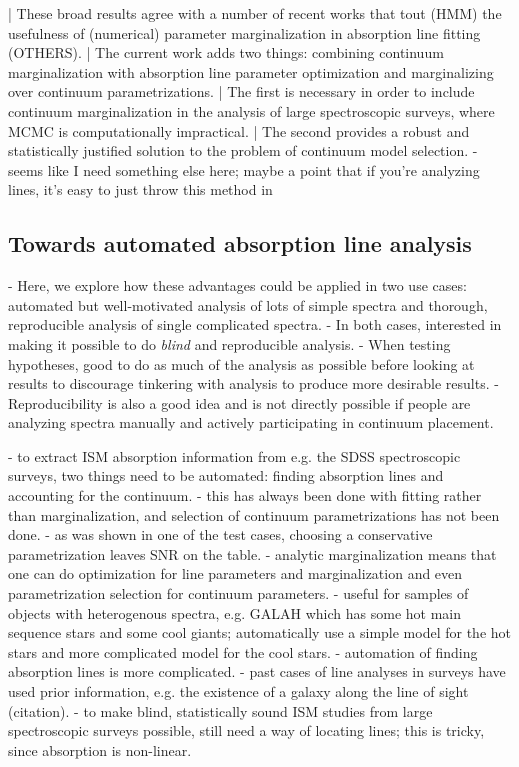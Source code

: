 \documentclass[manuscript]{aastex62}
\begin{document}
| These broad results agree with a number of recent works that tout (HMM) the usefulness of (numerical) parameter marginalization in absorption line fitting \citep{2017ApJ...844..136E} (OTHERS).
| The current work adds two things: combining continuum marginalization with absorption line parameter optimization and marginalizing over continuum parametrizations.
| The first is necessary in order to include continuum marginalization in the analysis of large spectroscopic surveys, where MCMC is computationally impractical.
| The second provides a robust and statistically justified solution to the problem of continuum model selection.
- seems like I need something else here; maybe a point that if you're analyzing lines, it's easy to just throw this method in


\subsection{Towards automated absorption line analysis}
- Here, we explore how these advantages could be applied in two use cases: automated but well-motivated analysis of lots of simple spectra and thorough, reproducible analysis of single complicated spectra.
- In both cases, interested in making it possible to do \emph{blind} and reproducible analysis.
- When testing hypotheses, good to do as much of the analysis as possible before looking at results to discourage tinkering with analysis to produce more desirable results.
- Reproducibility is also a good idea and is not directly possible if people are analyzing spectra manually and actively participating in continuum placement.

- to extract ISM absorption information from e.g. the SDSS spectroscopic surveys, two things need to be automated: finding absorption lines and accounting for the continuum.
- this has always been done with fitting rather than marginalization, and selection of continuum parametrizations has not been done.
- as was shown in one of the test cases, choosing a conservative parametrization leaves SNR on the table.
- analytic marginalization means that one can do optimization for line parameters and marginalization and even parametrization selection for continuum parameters.
- useful for samples of objects with heterogenous spectra, e.g. GALAH which has some hot main sequence stars and some cool giants; automatically use a simple model for the hot stars and more complicated model for the cool stars.
- automation of finding absorption lines is more complicated.
- past cases of line analyses in surveys have used prior information, e.g. the existence of a galaxy along the line of sight (citation).
- to make blind, statistically sound ISM studies from large spectroscopic surveys possible, still need a way of locating lines; this is tricky, since absorption is non-linear.
\end{document}
